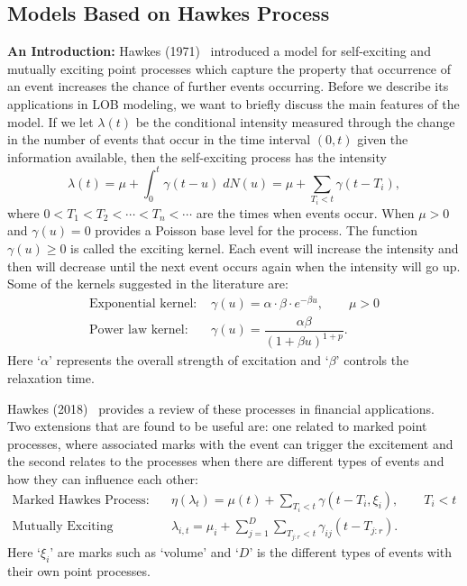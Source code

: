 \subsection{Models Based on Hawkes Process}

\noindent\textbf{An Introduction:} Hawkes (1971)~\cite{hawkes71} introduced a model for self-exciting and mutually exciting point processes which capture the property that occurrence of an event increases the chance of further events occurring. Before we describe its applications in LOB modeling, we want to briefly discuss the main features of the model. If we let $\lambda(t)$ be the conditional intensity measured through the change in the number of events that occur in the time interval $(0,t)$ given the information available, then the self-exciting process has the intensity
	\begin{equation} \label{eq:seintensity}
	\lambda(t)= \mu + \int_0^t \gamma(t-u) \;dN(u)= \mu + \sum_{T_i<t} \gamma(t-T_i),
	\end{equation}
where $0 < T_1 < T_2 < \cdots < T_n < \cdots$ are the times when events occur. When $\mu > 0$ and $\gamma(u)= 0$ provides a Poisson base level for the process. The function $\gamma(u) \geq 0$ is called the exciting kernel. Each event will increase the intensity and then will decrease until the next event occurs again when the intensity will go up. Some of the kernels suggested in the literature are:
	\begin{equation} \label{eq:suggex}
	\begin{split}
	\text{Exponential kernel: }& \gamma(u)= \alpha \cdot \beta \cdot e^{-\beta u}, \quad\quad \mu>0 \\
	\text{Power law kernel: }& \gamma(u)= \dfrac{\alpha \beta}{(1+\beta u)^{1+p}}.
	\end{split}
	\end{equation}
Here `$\alpha$' represents the overall strength of excitation and `$\beta$' controls the relaxation time. 


Hawkes (2018)~\cite{hawkes18} provides a review of these processes in financial applications. Two extensions that are found to be useful are: one related to marked point processes, where associated marks with the event can trigger the excitement and the second relates to the processes when there are different types of events and how they can influence each other:
	\begin{equation} \label{eq:markedhawk}
	\begin{split}
	\text{Marked Hawkes Process: }& \eta(\lambda_t)= \mu(t) + \sum_{T_i < t} \gamma(t - T_i, \xi_i), \quad \quad T_i < t \\
	\text{Mutually Exciting Process: }& \lambda_{i,t}= \mu_i + \sum_{j=1}^D \sum_{T_{j:r} < t} \gamma_{ij} (t - T_{j:r}).
	\end{split}
	\end{equation}
Here `$\xi_i$' are marks such as `volume' and `$D$' is the different types of events with their own point processes. \twomedskip


